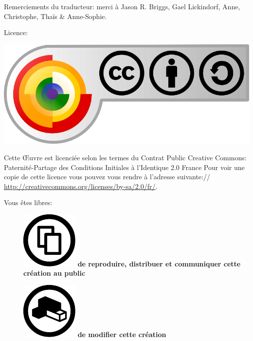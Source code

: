 \bigskip
Remerciements du traducteur: merci à Jason R. Briggs, Gael Lickindorf, Anne, Christophe, Thaïs \& Anne-Sophie.

\bigskip
\begin{center}

Licence:

\includegraphics[scale=0.4]{images/CC-BY-SA.png}\\ 

\end{center}


Cette Œuvre est licenciée selon les termes du Contrat Public Creative Commons: 
Paternité-Partage des Conditions Initiales à l'Identique 2.0 France
Pour voir une copie de cette licence vous pouvez vous rendre à l'adresse suivante://
\url{http://creativecommons.org/licenses/by-sa/2.0/fr/}.

\bigskip

Vous êtes libres:
\begin{description}

\item[] \includegraphics[scale=0.2]{images/Share.pdf}\bf{} de reproduire\rm, distribuer et communiquer cette création au public
\item[] \includegraphics[scale=0.2]{images/remix.pdf}\bf{} de modifier\rm{} cette création
\end{description}

